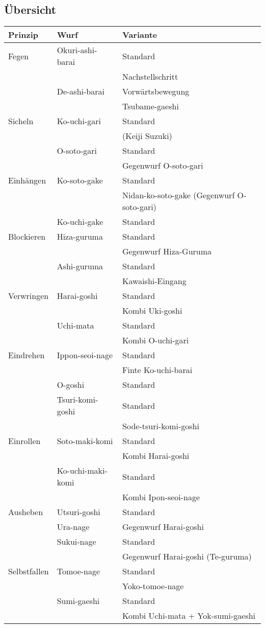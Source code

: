 \documentclass[justified, a4paper, notitlepage, captions=tableheading, nobib]{tufte-handout}
\begin{document}
\subsection{Übersicht}
\label{sec:org73f6f64}
\begin{center}
\begin{tabular}{lll}
Prinzip & Wurf & Variante\\
\hline
Fegen & Okuri-ashi-barai & Standard\\
 &  & Nachstellschritt\\
 & De-ashi-barai & Vorwärtsbewegung\\
 &  & Tsubame-gaeshi\\
Sicheln & Ko-uchi-gari & Standard\\
 &  & (Keiji Suzuki)\footnotemark\\
 & O-soto-gari & Standard\\
 &  & Gegenwurf O-soto-gari\\
Einhängen & Ko-soto-gake & Standard\\
 &  & Nidan-ko-soto-gake (Gegenwurf O-soto-gari)\\
 & Ko-uchi-gake & Standard\\
Blockieren & Hiza-guruma & Standard\\
 &  & Gegenwurf Hiza-Guruma\\
 & Ashi-guruma & Standard\\
 &  & Kawaishi-Eingang\\
Verwringen & Harai-goshi & Standard\\
 &  & Kombi Uki-goshi\\
 & Uchi-mata & Standard\\
 &  & Kombi O-uchi-gari\\
Eindrehen & Ippon-seoi-nage & Standard\\
 &  & Finte Ko-uchi-barai\\
 & O-goshi & Standard\\
 & Tsuri-komi-goshi & Standard\\
 &  & Sode-tsuri-komi-goshi\\
Einrollen & Soto-maki-komi & Standard\\
 &  & Kombi Harai-goshi\\
 & Ko-uchi-maki-komi & Standard\\
 &  & Kombi Ipon-seoi-nage\\
Ausheben & Utsuri-goshi & Standard\\
 & Ura-nage & Gegenwurf Harai-goshi\\
 & Sukui-nage & Standard\\
 &  & Gegenwurf Harai-goshi (Te-guruma)\\
Selbstfallen & Tomoe-nage & Standard\\
 &  & Yoko-tomoe-nage\\
 & Sumi-gaeshi & Standard\\
 &  & Kombi Uchi-mata + Yok-sumi-gaeshi\footnotemark\\
\end{tabular}
\end{center}
\end{document}
